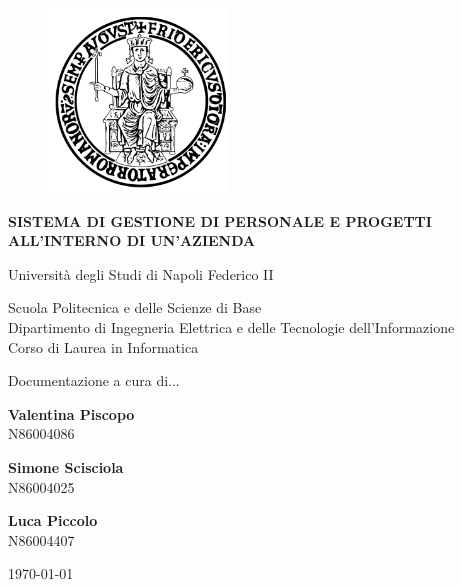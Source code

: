\documentclass{report}
\begin{document}
\begin{titlepage}
    \setcounter{chapter}{-1}
    
    \begin{figure}[htbp!]
        \begin{center}
            \includegraphics[width=.25\textwidth]{Logo/FedericoII.png}
        \end{center}
    \end{figure}
    
    \begin{center}
        \LARGE\bfseries SISTEMA DI GESTIONE DI PERSONALE E PROGETTI ALL’INTERNO DI UN’AZIENDA
    \end{center}
    
    \begin{center}
        \vspace{3\baselineskip}
        
        {\LARGE Università degli Studi di Napoli Federico II}         
        \vspace{1\baselineskip}
        
        {\large Scuola Politecnica e delle Scienze di Base \\
        Dipartimento di Ingegneria Elettrica e delle Tecnologie dell’Informazione \\
        Corso di Laurea in Informatica}
        \vspace{7\baselineskip}

        {\LARGE Documentazione a cura di...}\\
        \vspace{2\baselineskip}
        
        {\large \bfseries Valentina Piscopo} \\
        N86004086
	  \vspace{1\baselineskip}

        {\large \bfseries Simone Scisciola} \\
        N86004025
	  \vspace{1\baselineskip}

        {\large \bfseries Luca Piccolo} \\
        N86004407
        \vspace{8\baselineskip}


	  {\large \today}
   
    \end{center}
\end{titlepage}

\newpage
    \tableofcontents
    
    
    
    
    
    
    
    
\end{document}
